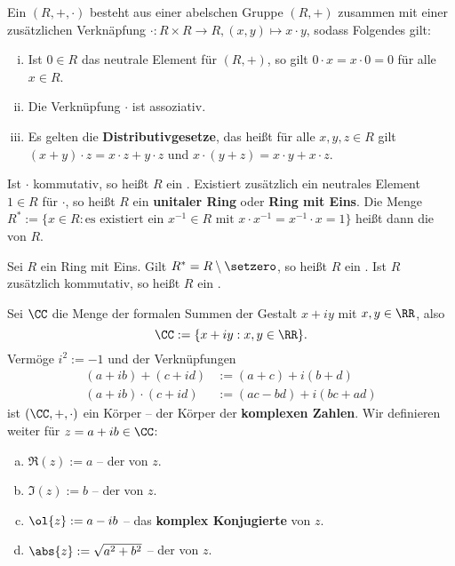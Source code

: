 \begin{definition}[Ring]
	\label{def:I.4.5}
	Ein  $(R,+,\cdot)$ besteht aus einer abelschen Gruppe $(R,+)$ zusammen mit einer zusätzlichen Verknäpfung $\cdot \colon R \times R \rightarrow R, (x,y) \mapsto x \cdot y$, sodass Folgendes gilt:
	\begin{enumerate}[(i)]
		\item Ist $0 \in R$ das neutrale Element für $(R,+)$, so gilt $0 \cdot x = x \cdot 0 = 0$ für alle $x \in R$.
		\item Die Verknüpfung $\cdot$ ist assoziativ.
		\item Es gelten die \textbf{Distributivgesetze}, das heißt für alle $x,y,z \in R$ gilt $(x+y) \cdot z = x\cdot z + y \cdot z$ und $x\cdot(y+z) = x \cdot y + x \cdot z$. 
	\end{enumerate}
	Ist $\cdot$ kommutativ, so heißt $R$ ein .
	Existiert zusätzlich ein neutrales Element $1 \in R$ für $\cdot$, so heißt $R$ ein \textbf{unitaler Ring} oder \textbf{Ring mit Eins}.
	Die Menge $R^* := \{x \in R : \text{es existiert ein } x^{-1} \in R \text{ mit } x \cdot x^{-1} = x^{-1} \cdot x = 1\}$ heißt dann die  von $R$.   
\end{definition}

\setcounter{definition}{6}
\begin{definition}
	\label{def:I.4.7}
	Sei $R$ ein Ring mit Eins.
	Gilt $R^* = R \setminus \setzero$, so heißt $R$ ein .
	Ist $R$ zusätzlich kommutativ, so heißt $R$ ein .
\end{definition}

\setcounter{definition}{9}
\begin{definition}
	\label{def:I.4.10}
	Sei $\CC$ die Menge der formalen Summen der Gestalt $x+iy$ mit $x,y \in \RR$, also
	\[
		\CC:= \{x+iy : x,y \in \RR\}.
	\]
	\newpage
	Vermöge $i^2 := -1$ und der Verknüpfungen
	\begin{align*}
		(a+ib) + (c+id) &:= (a+c) + i(b+d) \\
		(a+ib) \cdot (c+id) &:= (ac-bd) + i(bc+ad)
	\end{align*}
	ist $(\CC,+,\cdot)$ ein Körper -- der Körper der \textbf{komplexen Zahlen}. 
	Wir definieren weiter für $z = a+ib \in \CC$:
	\begin{enumerate}[a)]
		\item $\Re(z) := a$ -- der  von $z$.
		\item $\Im(z) := b$ -- der  von $z$.
		\item $\ol{z} := a-ib$ -- das \textbf{komplex Konjugierte} von $z$. 
		\item $\abs{z} := \sqrt{a^2+b^2}$ -- der  von $z$.
	\end{enumerate}
\end{definition}

